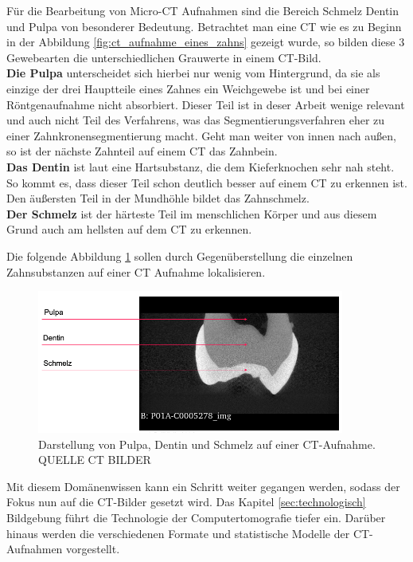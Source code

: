 Für die Bearbeitung von Micro-CT Aufnahmen sind die Bereich Schmelz Dentin und Pulpa
von besonderer Bedeutung. Betrachtet man eine CT wie es zu Beginn in der
Abbildung \ref{fig:ct_aufnahme_eines_zahns} gezeigt wurde, so bilden diese 3 Gewebearten
die unterschiedlichen Grauwerte in einem CT-Bild. \\ \textbf{Die Pulpa} unterscheidet
sich hierbei nur wenig vom Hintergrund, da sie als einzige der drei Hauptteile
eines Zahnes ein Weichgewebe ist und bei einer Röntgenaufnahme nicht absorbiert.
Dieser Teil ist in deser Arbeit wenige relevant und auch nicht Teil des Verfahrens,
was das Segmentierungsverfahren eher zu einer Zahnkronensegmentierung macht. Geht
man weiter von innen nach außen, so ist der nächste Zahnteil auf einem CT das
Zahnbein. \\ \textbf{Das Dentin} ist laut \citet[Seite 41]{lehmann2012Zahnheilkunde}
eine Hartsubstanz, die dem Kieferknochen sehr nah steht. So kommt es, dass dieser
Teil schon deutlich besser auf einem CT zu erkennen ist. Den äußersten Teil in
der Mundhöhle bildet das Zahnschmelz. \\ \textbf{Der Schmelz} ist der härteste
Teil im menschlichen Körper und aus diesem Grund auch am hellsten auf dem CT zu
erkennen.

Die folgende Abbildung \ref{fig:pulpa_dentin_schmelz} sollen durch
Gegenüberstellung die einzelnen Zahnsubstanzen auf einer CT Aufnahme
lokalisieren.

\begin{figure}[h]
	\centering
	\includegraphics[width=0.9\textwidth]{img/dentin_schmelz_pulpa.png}
	\caption{Darstellung von Pulpa, Dentin und Schmelz auf einer CT-Aufnahme.
	QUELLE CT BILDER}
	\label{fig:pulpa_dentin_schmelz}
\end{figure}

Mit diesem Domänenwissen kann ein Schritt weiter gegangen werden, sodass der
Fokus nun auf die CT-Bilder gesetzt wird. Das Kapitel \ref{sec:technologisch} Bildgebung
führt die Technologie der Computertomografie tiefer ein. Darüber hinaus werden
die verschiedenen Formate und statistische Modelle der CT-Aufnahmen vorgestellt.

